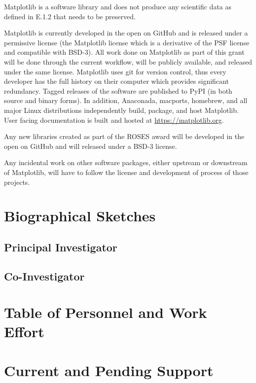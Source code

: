 \documentclass[12pt]{article}
\numberwithin{page}{section}
\begin{document}
Matplotlib is a software library and does not produce any scientific
data as defined in E.1.2 that needs to be preserved.

Matplotlib is currently developed in the open on GitHub and is
released under a permissive license (the Matplotlib license which is a
derivative of the PSF license and compatible with BSD-3).  All work
done on Matplotlib as part of this grant will be done through the
current workflow, will be publicly available, and released under the
same license.  Matplotlib uses git for version control, thus every
developer has the full history on their computer which provides
significant redundancy.  Tagged releases of the software are published
to PyPI (in both source and binary forms).  In addition, Anaconada,
macports, homebrew, and all major Linux distributions independently
build, package, and host Matplotlib.  User facing documentation is built
and hosted at \url{https://matplotlib.org}.


Any new libraries created as part of the ROSES award will be developed
in the open on GitHub and will released under a BSD-3 license.

Any incidental work on other software packages, either upstream or
downstream of Matplotlib, will have to follow the license and
development of process of those projects.


\newpage
\section{Biographical Sketches}
\setcounter{page}{1}
\subsection{Principal Investigator}
\newpage
\subsection{Co-Investigator}

\newpage
\section{Table of Personnel and Work Effort}
\setcounter{page}{1}

\newpage
\section{Current and Pending Support}
\setcounter{page}{1}
\end{document}
